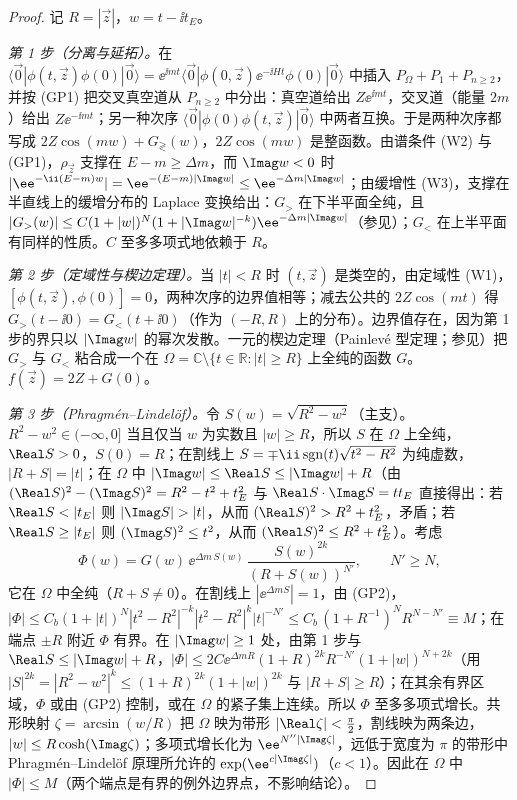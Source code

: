 \begin{proof}
记 $R=|\vec z|$，$w=t-\ii t_E$。

\emph{第 1 步（分离与延拓）。}在 $\langle\vec 0|\phi(t,\vec z)\phi(0)|\vec 0\rangle=\ee^{\ii mt}\langle\vec 0|\phi(0,\vec z)\ee^{-\ii Ht}\phi(0)|\vec 0\rangle$ 中插入 $P_\Omega+P_1+P_{n\ge2}$，并按 (GP1) 把交叉真空道从 $P_{n\ge2}$ 中分出：真空道给出 $Z\ee^{\ii mt}$，交叉道（能量 $2m$）给出 $Z\ee^{-\ii mt}$；另一种次序 $\langle\vec 0|\phi(0)\phi(t,\vec z)|\vec 0\rangle$ 中两者互换。于是两种次序都写成 $2Z\cos(mw)+G_\gtrless(w)$，$2Z\cos(mw)$ 是整函数。由谱条件 (W2) 与 (GP1)，$\rho_{\vec z}$ 支撑在 $E-m\ge\Delta m$，而 $\Imag w<0$ 时 $|\ee^{-\ii(E-m)w}|=\ee^{-(E-m)|\Imag w|}\le\ee^{-\Delta m|\Imag w|}$；由缓增性 (W3)，支撑在半直线上的缓增分布的 Laplace 变换给出：$G_>$ 在下半平面全纯，且 $|G_>(w)|\le C(1+|w|)^{N}(1+|\Imag w|^{-k})\ee^{-\Delta m|\Imag w|}$（参见\cite{Vladimirov2002,Streater:1989vi}）；$G_<$ 在上半平面有同样的性质。$C$ 至多多项式地依赖于 $R$。

\emph{第 2 步（定域性与楔边定理）。}当 $|t|<R$ 时 $(t,\vec z)$ 是类空的，由定域性 (W1)，$[\phi(t,\vec z),\phi(0)]=0$，两种次序的边界值相等；减去公共的 $2Z\cos(mt)$ 得 $G_>(t-\ii0)=G_<(t+\ii0)$（作为 $(-R,R)$ 上的分布）。边界值存在，因为第 1 步的界只以 $|\Imag w|$ 的幂次发散。一元的楔边定理（Painlevé 型定理；参见\cite{Streater:1989vi}）把 $G_>$ 与 $G_<$ 粘合成一个在
$\Omega=\mathbb C\setminus\{t\in\mathbb R:|t|\ge R\}$ 上全纯的函数 $G$。$f(\vec z)=2Z+G(0)$。

\emph{第 3 步（Phragmén--Lindelöf）。}令 $S(w)=\sqrt{R^2-w^2}$（主支）。$R^2-w^2\in(-\infty,0]$ 当且仅当 $w$ 为实数且 $|w|\ge R$，所以 $S$ 在 $\Omega$ 上全纯，$\Real S>0$，$S(0)=R$；在割线上 $S=\mp\ii\,{\rm sgn}(t)\sqrt{t^2-R^2}$ 为纯虚数，$|R+S|=|t|$；在 $\Omega$ 中 $|\Imag w|\le\Real S\le|\Imag w|+R$（由 $(\Real S)^2-(\Imag S)^2=R^2-t^2+t_E^2$ 与 $\Real S\cdot\Imag S=tt_E$ 直接得出：若 $\Real S<|t_E|$ 则 $|\Imag S|>|t|$，从而 $(\Real S)^2>R^2+t_E^2$，矛盾；若 $\Real S\ge|t_E|$ 则 $(\Imag S)^2\le t^2$，从而 $(\Real S)^2\le R^2+t_E^2$）。考虑
\[
\Phi(w)=G(w)\,\ee^{\Delta m\,S(w)}\,\frac{S(w)^{2k}}{(R+S(w))^{N'}},\qquad N'\ge N,
\]
它在 $\Omega$ 中全纯（$R+S\neq0$）。在割线上 $|\ee^{\Delta mS}|=1$，由 (GP2)，$|\Phi|\le C_b(1+|t|)^N|t^2-R^2|^{-k}|t^2-R^2|^k|t|^{-N'}\le C_b\,(1+R^{-1})^N R^{N-N'}\equiv M$；在端点 $\pm R$ 附近 $\Phi$ 有界。在 $|\Imag w|\ge1$ 处，由第 1 步与 $\Real S\le|\Imag w|+R$，$|\Phi|\le2C\ee^{\Delta mR}(1+R)^{2k}R^{-N'}(1+|w|)^{N+2k}$（用 $|S|^{2k}=|R^2-w^2|^k\le(1+R)^{2k}(1+|w|)^{2k}$ 与 $|R+S|\ge R$）；在其余有界区域，$\Phi$ 或由 (GP2) 控制，或在 $\Omega$ 的紧子集上连续。所以 $\Phi$ 至多多项式增长。共形映射 $\zeta=\arcsin(w/R)$ 把 $\Omega$ 映为带形 $|\Real\zeta|<\frac\pi2$，割线映为两条边，$|w|\le R\cosh(\Imag\zeta)$；多项式增长化为 $\ee^{N''|\Imag\zeta|}$，远低于宽度为 $\pi$ 的带形中 Phragmén--Lindelöf 原理所允许的 $\exp(\ee^{c|\Imag\zeta|})$（$c<1$）\cite{Titchmarsh1939}。因此在 $\Omega$ 中 $|\Phi|\le M$（两个端点是有界的例外边界点，不影响结论）。


\end{proof}
